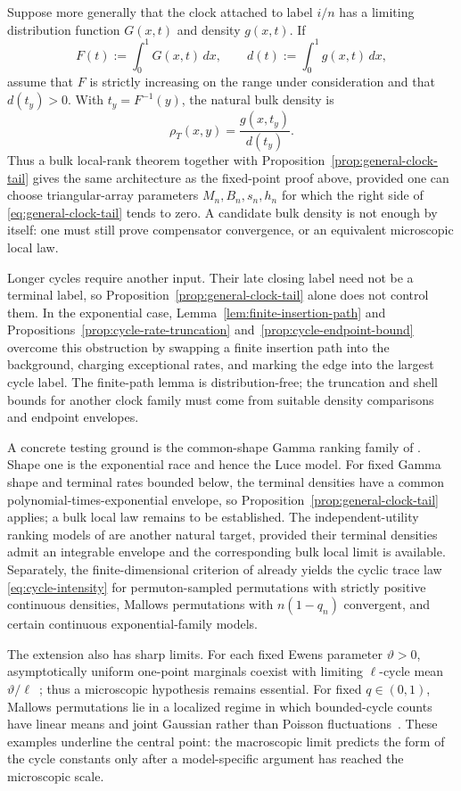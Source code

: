 \documentclass[11pt]{article}
\theoremstyle{remark}
\theoremstyle{plain}
\begin{document}
Suppose more generally that the clock attached to label $i/n$ has a limiting
distribution function $G(x,t)$ and density $g(x,t)$.  If
\[
 F(t):=\int_0^1G(x,t)\,dx,\qquad
 d(t):=\int_0^1g(x,t)\,dx,
\]
assume that $F$ is strictly increasing on the range under consideration and
that $d(t_y)>0$.  With $t_y=F^{-1}(y)$, the natural bulk density is
\begin{equation}\label{eq:general-clock-density}
 \rho_T(x,y)=\frac{g(x,t_y)}{d(t_y)}.
\end{equation}
Thus a bulk local-rank theorem together with
Proposition~\ref{prop:general-clock-tail} gives the same architecture as the
fixed-point proof above, provided one can choose triangular-array parameters
$M_n,B_n,s_n,h_n$ for which the right side of
\eqref{eq:general-clock-tail} tends to zero.  A candidate bulk density is not
enough by itself: one must still prove compensator convergence, or an
equivalent microscopic local law.

Longer cycles require another input.  Their late closing label need not be a
terminal label, so Proposition~\ref{prop:general-clock-tail} alone does not
control them.  In the exponential case, Lemma~\ref{lem:finite-insertion-path}
and Propositions~\ref{prop:cycle-rate-truncation}
and~\ref{prop:cycle-endpoint-bound} overcome this obstruction by swapping a
finite insertion path into the background, charging exceptional rates, and
marking the edge into the largest cycle label.  The finite-path lemma is
distribution-free; the truncation and shell bounds for another clock family
must come from suitable density comparisons and endpoint envelopes.

A concrete testing ground is the common-shape Gamma ranking family of
\cite{stern1990models}.  Shape one is the exponential race and hence the Luce
model.  For fixed Gamma shape and terminal rates bounded below, the terminal
densities have a common polynomial-times-exponential envelope, so
Proposition~\ref{prop:general-clock-tail} applies; a bulk local law remains to
be established.  The independent-utility ranking models of
\cite{thurstone1927law} are another natural target, provided their terminal
densities admit an integrable envelope and the corresponding bulk local limit
is available.  Separately, the finite-dimensional criterion of
\cite{mukherjee2016fixed} already yields the cyclic trace law
\eqref{eq:cycle-intensity} for permuton-sampled permutations with strictly
positive continuous densities, Mallows permutations with $n(1-q_n)$
convergent, and certain continuous exponential-family models.

The extension also has sharp limits.  For each fixed Ewens
parameter $\vartheta>0$, asymptotically uniform one-point marginals coexist
with limiting $\ell$-cycle mean $\vartheta/\ell$~\cite{tavare2021magical};
thus a microscopic hypothesis remains essential.  For fixed $q\in(0,1)$,
Mallows permutations lie in a localized regime in which bounded-cycle counts
have linear means and joint Gaussian rather than Poisson
fluctuations~\cite{he2023cycles}.  These examples underline the central
point: the macroscopic limit predicts the form of the cycle constants only
after a model-specific argument has reached the microscopic scale.


\small

\end{document}
